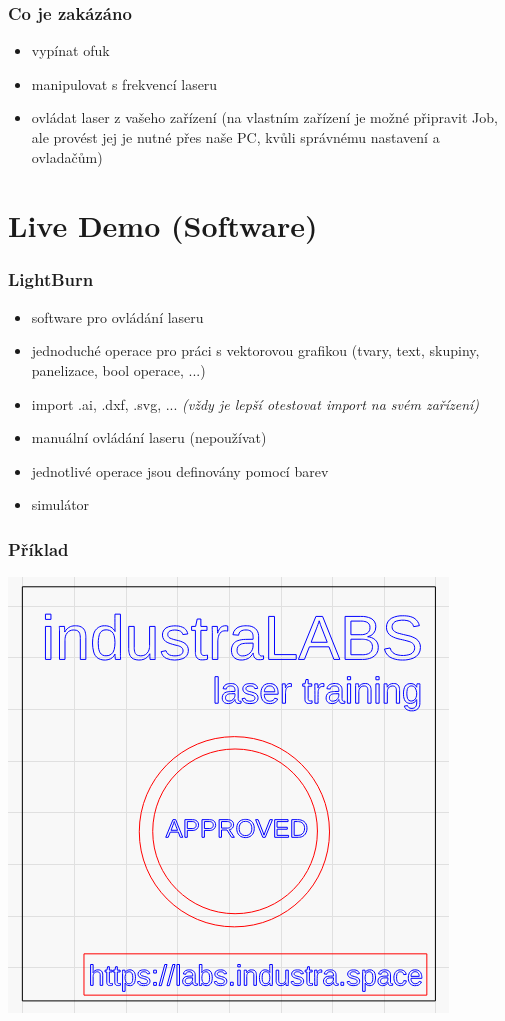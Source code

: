 \documentclass[14pt]{beamer}
\begin{document}
\begin{frame}
\frametitle{Co je zakázáno}

\begin{itemize}
	\item vypínat ofuk
	\item manipulovat s frekvencí laseru
	\item ovládat laser z vašeho zařízení (na vlastním zařízení je možné připravit Job, ale provést jej je nutné přes naše PC, kvůli správnému nastavení a ovladačům)
\end{itemize}


\end{frame}



\section{Live Demo (Software)}

\begin{frame}
\frametitle{LightBurn}

\begin{itemize}
	\item software pro ovládání laseru
	\item jednoduché operace pro práci s vektorovou grafikou (tvary, text, skupiny, panelizace, bool operace, ...)
	\item import .ai, .dxf, .svg, ... \textit{(vždy je lepší otestovat import na svém zařízení)}
	\item manuální ovládání laseru (nepoužívat)
	\item jednotlivé operace jsou definovány pomocí barev
	\item simulátor
\end{itemize}


\end{frame}

\begin{frame}
\frametitle{Příklad}
\centering
\includegraphics[scale=0.5]{imgs/lb_example.png}
\end{frame}
\end{document}
